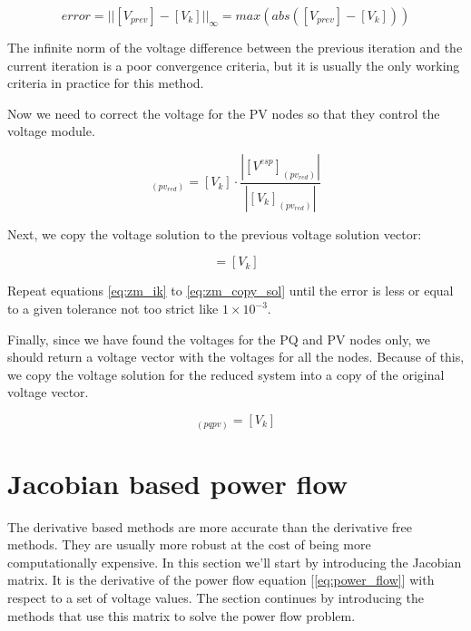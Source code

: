 \documentclass[nols,a4paper,twoside,notoc,fleqn]{tufte-book}
\begin{document}
\begin{equation}
error = ||[V_{prev}] - [V_k] ||_{\infty} = max(abs([V_{prev}] - [V_k] ))
\end{equation}

The infinite norm of the voltage difference between the previous iteration and the current iteration is a poor convergence criteria, but it is usually the only working criteria in practice for this method.

Now we need to correct the voltage for the PV nodes so that they control the voltage module.

\begin{equation}
[V_k]_{ (pv_{red})} = [V_k] \cdot \frac{|[V^{esp}]_{(pv_{red})}|}{|[V_k]_{(pv_{red})}|}
\label{eq:zm_pv_correction}
\end{equation}


Next, we copy the voltage solution to the previous voltage solution vector:

\begin{equation}
[V_{prev}] = [V_k]
\label{eq:zm_copy_sol}
\end{equation}

Repeat equations \ref{eq:zm_ik} to \ref{eq:zm_copy_sol} until the error is less or equal to a given tolerance not too strict like $1\times10^{-3}$.

Finally, since we have found the voltages for the PQ and PV nodes only, we should return a voltage vector with the voltages for all the nodes. Because of this, we copy the voltage solution for the reduced system into a copy of the original voltage vector.

\begin{equation}
[V]_{(pqpv)} = [V_k]
\end{equation}


\section{Jacobian based power flow}

The derivative based methods are more accurate than the derivative free methods. They are usually more robust at the cost of being more computationally expensive. In this section we'll start by introducing the Jacobian matrix. It is the derivative of the power flow equation  [\ref{eq:power_flow}] with respect to a set of voltage values. The section continues by introducing the methods that use this matrix to solve the power flow problem.
\end{document}
